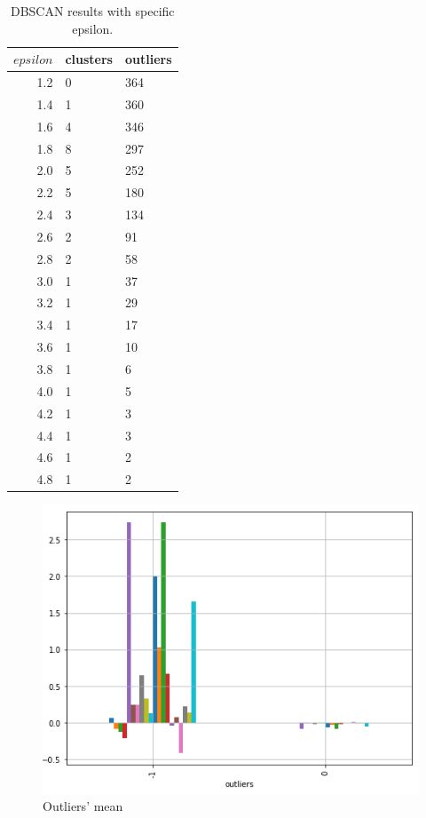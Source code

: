 \documentclass[sigconf]{acmart}
\begin{document}
\begin{table}
  \caption{DBSCAN results with specific epsilon.}
  \label{tab:eps}
  \begin{tabular}{rll}
    \toprule
    $epsilon$ & clusters & outliers \\
    \midrule
    1.2  & 0  & 364 \\
    1.4  & 1  & 360 \\
    1.6  & 4  & 346 \\
    1.8  & 8  & 297 \\
    2.0  & 5  & 252 \\
    2.2  & 5  & 180 \\
    2.4  & 3  & 134 \\
    2.6  & 2  & 91  \\
    2.8  & 2  & 58  \\
    3.0  & 1  & 37  \\
    3.2  & 1  & 29  \\
    3.4  & 1  & 17  \\
    3.6  & 1  & 10  \\
    3.8  & 1  & 6   \\
    4.0  & 1  & 5   \\
    4.2  & 1  & 3   \\
    4.4  & 1  & 3   \\
    4.6  & 1  & 2   \\
    4.8  & 1  & 2   \\
    \bottomrule
\end{tabular}
\end{table}

\begin{figure}[h]
    \includegraphics[width=\linewidth]{outliers-mean.png}
    \centering
    \caption{Outliers' mean}
\end{figure}
\end{document}
